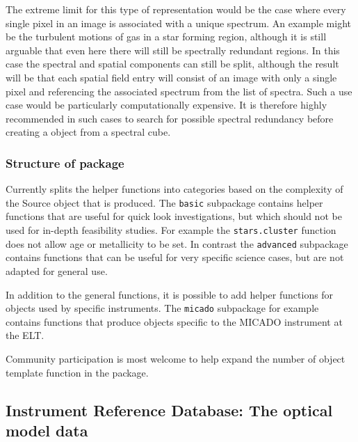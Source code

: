 The extreme limit for this type of representation would be the case where every single pixel in an image is associated with a unique spectrum.
An example might be the turbulent motions of gas in a star forming region, although it is still arguable that even here there will still be spectrally redundant regions.
In this case the spectral and spatial components can still be split, although the result will be that each spatial field entry will consist of an image with only a single pixel and referencing the associated spectrum from the list of spectra.
Such a use case would be particularly computationally expensive.
It is therefore highly recommended in such cases to search for possible spectral redundancy before creating a \Source{} object from a spectral cube.


\subsubsection{Structure of \ScopeSimtemplates{} package}
\label{structure-of-scopesim-templates-package}


Currently \ScopeSimtemplates{} splits the helper functions into categories based on the complexity of the Source object that is produced.
The \lstinline{basic} subpackage contains helper functions that are useful for quick look investigations, but which should not be used for in-depth feasibility studies.
For example the \lstinline{stars.cluster} function does not allow age or metallicity to be set.
In contrast the \lstinline{advanced} subpackage contains functions that can be useful for very specific science cases, but are not adapted for general use.

In addition to the general functions, it is possible to add helper functions for objects used by specific instruments.
The \lstinline{micado} subpackage for example contains functions that produce objects specific to the MICADO instrument at the ELT.

Community participation is most welcome to help expand the number of object template function in the \ScopeSimtemplates{} package.


\subsection{Instrument Reference Database: The optical model data}
\label{instrument-reference-database-the-optical-model-data}

